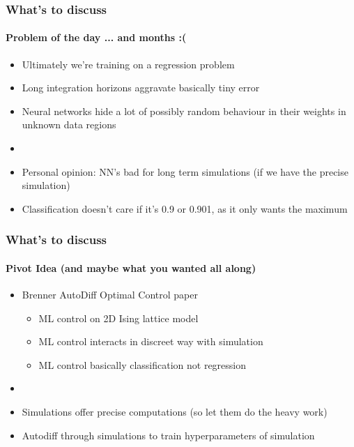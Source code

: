 \documentclass[usenames, dvipsnames, t]{beamer}
\begin{document}
\begin{frame}
	\frametitle{What's to discuss}
	\framesubtitle{Problem of the day ... and months :( }
	\begin{itemize}
		\item Ultimately we're training on a regression problem
		\item Long integration horizons aggravate basically tiny error
		\item Neural networks hide a lot of possibly random behaviour in their weights in unknown data regions
		\item[] 
		\item Personal opinion: NN's bad for long term simulations (if we have the precise simulation)
		\item Classification doesn't care if it's 0.9 or 0.901, as it only wants the maximum
	\end{itemize}
\end{frame}

\begin{frame}
	\frametitle{What's to discuss}
	\framesubtitle{Pivot Idea (and maybe what you wanted all along)}
	\begin{itemize}
		\item Brenner AutoDiff Optimal Control paper
		\begin{itemize}
			\item ML control on 2D Ising lattice model
			\item ML control interacts in discreet way with simulation
			\item ML control basically classification not regression
		\end{itemize}
		\item[]
		\item Simulations offer precise computations (so let them do the heavy work)
		\item Autodiff through simulations to train hyperparameters of simulation
	\end{itemize}
\end{frame}
\end{document}
